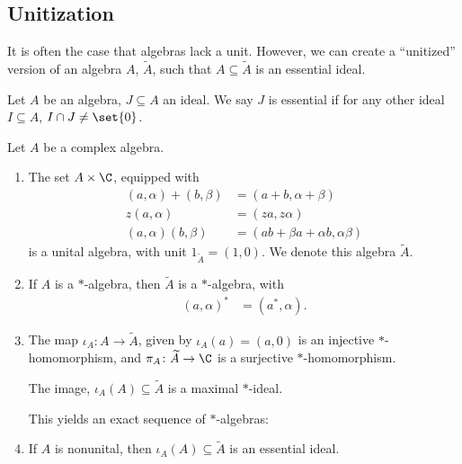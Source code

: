 \documentclass[10pt]{mypackage}
\begin{document}
\subsection{Unitization}%
It is often the case that algebras lack a unit. However, we can create a ``unitized'' version of an algebra $A$, $\widetilde{A}$, such that $A\subseteq \widetilde{A}$ is an essential ideal.
\begin{definition}
  Let $A$ be an algebra, $J\subseteq A$ an ideal. We say $J$ is essential if for any other ideal $I\subseteq A$, $I\cap J \neq \set{0}$.
\end{definition}
\begin{proposition}
  Let $A$ be a complex algebra.
  \begin{enumerate}[(1)]
    \item The set $A\times \C$, equipped with
      \begin{align*}
        \left(a,\alpha\right) + \left(b,\beta\right) &= \left(a+b,\alpha + \beta\right)\\
        z\left(a,\alpha\right) &= \left(za,z\alpha\right)\\
        \left(a,\alpha\right)\left(b,\beta\right) &= \left(ab + \beta a + \alpha b,\alpha \beta\right)
      \end{align*}
      is a unital algebra, with unit $1_{\widetilde{A}} = (1,0)$. We denote this algebra $\widetilde{A}$.
    \item If $A$ is a $\ast$-algebra, then $\widetilde{A}$ is a $\ast$-algebra, with
      \begin{align*}
        \left(a,\alpha\right)^{\ast} &= \left(a^{\ast},\alpha\right).
      \end{align*}
    \item The map $\iota_A\colon A\rightarrow \widetilde{A}$, given by $\iota_A\left(a\right) = \left(a,0\right)$ is an injective $\ast$-homomorphism, and $\pi_A\colon \widetilde{A} \rightarrow \C$ is a surjective $\ast$-homomorphism.\newline

      The image, $\iota_A\left(A\right)\subseteq \widetilde{A}$ is a maximal $\ast$-ideal.\newline

      This yields an exact sequence of $\ast$-algebras:
      \begin{center}
      \end{center}
    \item If $A$ is nonunital, then $\iota_A\left(A\right)\subseteq \widetilde{A}$ is an essential ideal.
  \end{enumerate}
\end{proposition}
\end{document}
